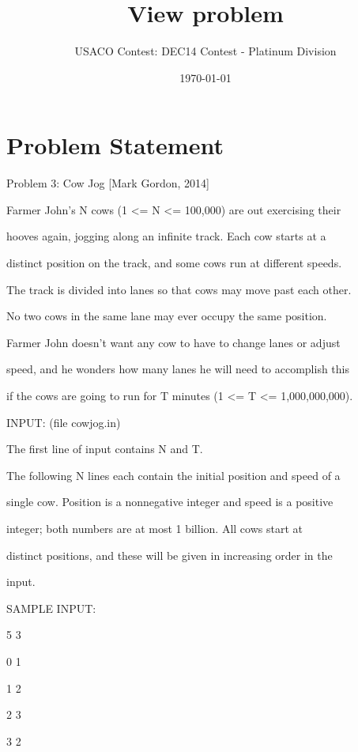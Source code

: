 \documentclass[12pt]{article}
\title{View problem}
\author{USACO Contest: DEC14 Contest - Platinum Division}
\date{\today}
\begin{document}
\maketitle

\section*{Problem Statement}

Problem 3: Cow Jog [Mark Gordon, 2014]



Farmer John's N cows (1 <= N <= 100,000) are out exercising their

hooves again, jogging along an infinite track.  Each cow starts at a

distinct position on the track, and some cows run at different speeds.



The track is divided into lanes so that cows may move past each other.

No two cows in the same lane may ever occupy the same position.

Farmer John doesn't want any cow to have to change lanes or adjust

speed, and he wonders how many lanes he will need to accomplish this

if the cows are going to run for T minutes (1 <= T <= 1,000,000,000).



INPUT: (file cowjog.in)



The first line of input contains N and T.



The following N lines each contain the initial position and speed of a

single cow.  Position is a nonnegative integer and speed is a positive

integer; both numbers are at most 1 billion.  All cows start at

distinct positions, and these will be given in increasing order in the

input.



SAMPLE INPUT:



5 3

0 1

1 2

2 3

3 2
\end{document}

